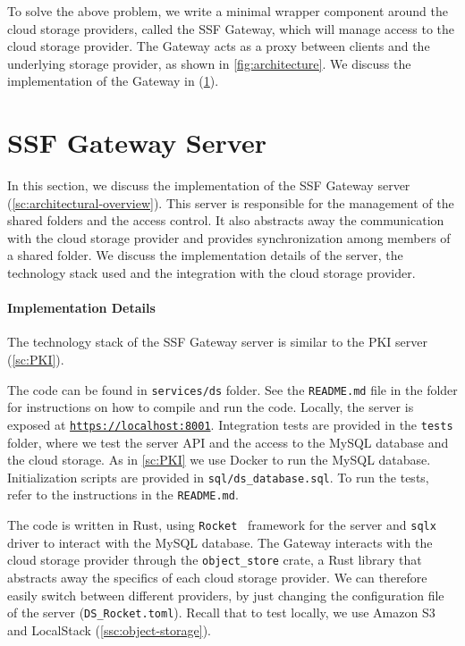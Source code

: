 To solve the above problem, we write a minimal wrapper component around
the cloud storage providers, called the SSF Gateway, which will manage
access to the cloud storage provider. The Gateway acts as a proxy
between clients and the underlying storage provider, as shown in
\cref{fig:architecture}. We discuss the implementation of the
Gateway in (\cref{sc:ssf-proxy-server}).


\section{SSF Gateway Server}\label{sc:ssf-proxy-server}

In this section, we discuss the implementation of the SSF Gateway server 
(\cref{sc:architectural-overview}). This server is responsible for the
management of the shared folders and the access control.
It also abstracts away the communication with the cloud storage provider
and provides synchronization among members of a shared folder.
We discuss the implementation details
of the server, the technology stack used and the
integration with the cloud storage provider.

\paragraph{Implementation Details}
The technology stack of the SSF Gateway server
is similar to the PKI server (\cref{sc:PKI}).

The code can be found in \texttt{services/ds} folder.
See the \texttt{README.md} file in the folder for instructions
on how to compile and run the code.
Locally, the server is exposed at \texttt{\url{https://localhost:8001}}.
Integration tests are provided in the \texttt{tests} folder,
where we test the server API and the access to the 
MySQL database and the cloud storage.
As in \cref{sc:PKI} we use Docker to run the MySQL database.
Initialization scripts are provided in \texttt{sql/ds\_database.sql}.
To run the tests, refer to the instructions in the \texttt{README.md}.

The code is written in Rust, using \texttt{Rocket}~\cite{Rocket}
framework for the server and \texttt{sqlx} driver to interact
with the MySQL database.
The Gateway interacts with the cloud storage provider
through the \texttt{object\_store} crate, a Rust library
that abstracts away the specifics of each cloud storage provider.
We can therefore easily switch between different providers, by
just changing the configuration file of the server (\texttt{DS\_Rocket.toml}).
Recall that to test locally, we use Amazon S3 and
LocalStack (\cref{ssc:object-storage}).

